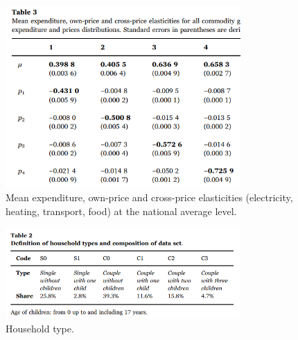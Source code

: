 \begin{figure}[h]  %
	\centering
	\includegraphics[width=0.8\textwidth]{./figure/ch2/fig2.2_table3.png}
	\caption{Mean expenditure, own-price and cross-price elasticities (electricity, heating, transport, food) at the national average level.}\label{fig2.2}
\end{figure}

\begin{figure}[h]  %
	\centering
		\includegraphics[width=0.8\textwidth]{./figure/ch2/fig2.3_table2.png}
	\caption{Household type.}\label{fig2.3}

\end{figure}

